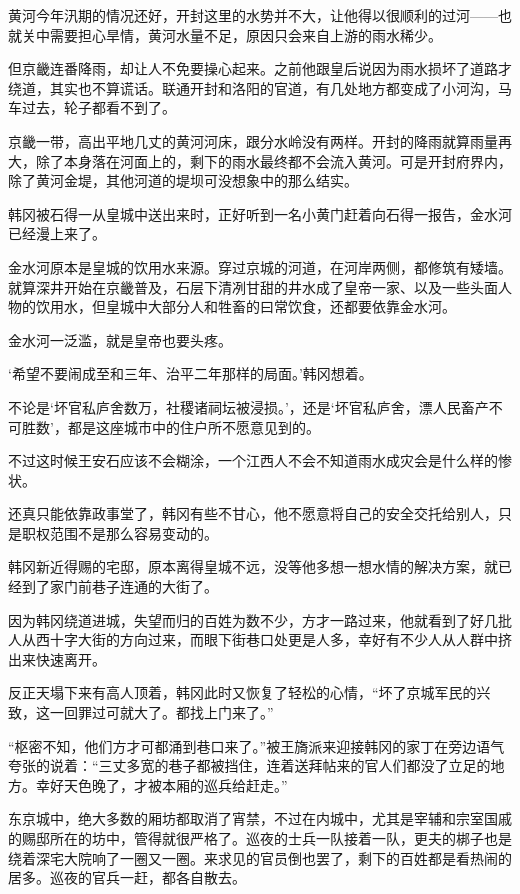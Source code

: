 黄河今年汛期的情况还好，开封这里的水势并不大，让他得以很顺利的过河——也就关中需要担心旱情，黄河水量不足，原因只会来自上游的雨水稀少。

但京畿连番降雨，却让人不免要操心起来。之前他跟皇后说因为雨水损坏了道路才绕道，其实也不算谎话。联通开封和洛阳的官道，有几处地方都变成了小河沟，马车过去，轮子都看不到了。

京畿一带，高出平地几丈的黄河河床，跟分水岭没有两样。开封的降雨就算雨量再大，除了本身落在河面上的，剩下的雨水最终都不会流入黄河。可是开封府界内，除了黄河金堤，其他河道的堤坝可没想象中的那么结实。

韩冈被石得一从皇城中送出来时，正好听到一名小黄门赶着向石得一报告，金水河已经漫上来了。

金水河原本是皇城的饮用水来源。穿过京城的河道，在河岸两侧，都修筑有矮墙。就算深井开始在京畿普及，石层下清冽甘甜的井水成了皇帝一家、以及一些头面人物的饮用水，但皇城中大部分人和牲畜的曰常饮食，还都要依靠金水河。

金水河一泛滥，就是皇帝也要头疼。

‘希望不要闹成至和三年、治平二年那样的局面。’韩冈想着。

不论是‘坏官私庐舍数万，社稷诸祠坛被浸损。’，还是‘坏官私庐舍，漂人民畜产不可胜数’，都是这座城市中的住户所不愿意见到的。

不过这时候王安石应该不会糊涂，一个江西人不会不知道雨水成灾会是什么样的惨状。

还真只能依靠政事堂了，韩冈有些不甘心，他不愿意将自己的安全交托给别人，只是职权范围不是那么容易变动的。

韩冈新近得赐的宅邸，原本离得皇城不远，没等他多想一想水情的解决方案，就已经到了家门前巷子连通的大街了。

因为韩冈绕道进城，失望而归的百姓为数不少，方才一路过来，他就看到了好几批人从西十字大街的方向过来，而眼下街巷口处更是人多，幸好有不少人从人群中挤出来快速离开。

反正天塌下来有高人顶着，韩冈此时又恢复了轻松的心情，“坏了京城军民的兴致，这一回罪过可就大了。都找上门来了。”

“枢密不知，他们方才可都涌到巷口来了。”被王旖派来迎接韩冈的家丁在旁边语气夸张的说着：“三丈多宽的巷子都被挡住，连着送拜帖来的官人们都没了立足的地方。幸好天色晚了，才被本厢的巡兵给赶走。”

东京城中，绝大多数的厢坊都取消了宵禁，不过在内城中，尤其是宰辅和宗室国戚的赐邸所在的坊中，管得就很严格了。巡夜的士兵一队接着一队，更夫的梆子也是绕着深宅大院响了一圈又一圈。来求见的官员倒也罢了，剩下的百姓都是看热闹的居多。巡夜的官兵一赶，都各自散去。

